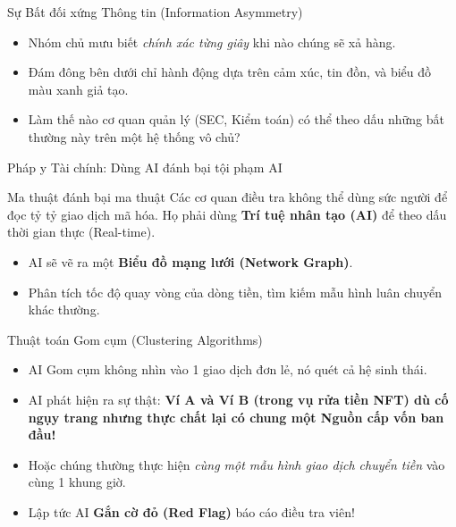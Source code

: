 \documentclass[aspectratio=169, 12pt]{beamer}
\begin{document}
\begin{frame}{Sự Bất đối xứng Thông tin (Information Asymmetry)}
    \begin{itemize}
        \item Nhóm chủ mưu biết \textit{chính xác từng giây} khi nào chúng sẽ xả hàng.
        \item Đám đông bên dưới chỉ hành động dựa trên cảm xúc, tin đồn, và biểu đồ màu xanh giả tạo.
        \item Làm thế nào cơ quan quản lý (SEC, Kiểm toán) có thể theo dấu những bất thường này trên một hệ thống vô chủ?
    \end{itemize}
\end{frame}

\begin{frame}{Pháp y Tài chính: Dùng AI đánh bại tội phạm AI}
    \begin{block}{Ma thuật đánh bại ma thuật}
        Các cơ quan điều tra không thể dùng sức người để đọc tỷ tỷ giao dịch mã hóa. Họ phải dùng \textbf{Trí tuệ nhân tạo (AI)} để theo dấu thời gian thực (Real-time).
    \end{block}
    \begin{itemize}
        \item AI sẽ vẽ ra một \textbf{Biểu đồ mạng lưới (Network Graph)}.
        \item Phân tích tốc độ quay vòng của dòng tiền, tìm kiếm mẫu hình luân chuyển khác thường.
    \end{itemize}
\end{frame}

\begin{frame}{Thuật toán Gom cụm (Clustering Algorithms)}
    \begin{itemize}
        \item AI Gom cụm không nhìn vào 1 giao dịch đơn lẻ, nó quét cả hệ sinh thái.
        \item AI phát hiện ra sự thật: \textbf{Ví A và Ví B (trong vụ rửa tiền NFT) dù cố ngụy trang nhưng thực chất lại có chung một Nguồn cấp vốn ban đầu!}
        \item Hoặc chúng thường thực hiện \textit{cùng một mẫu hình giao dịch chuyển tiền} vào cùng 1 khung giờ.
        \item Lập tức AI \textbf{Gắn cờ đỏ (Red Flag)} báo cáo điều tra viên!
    \end{itemize}
\end{frame}

\end{document}
